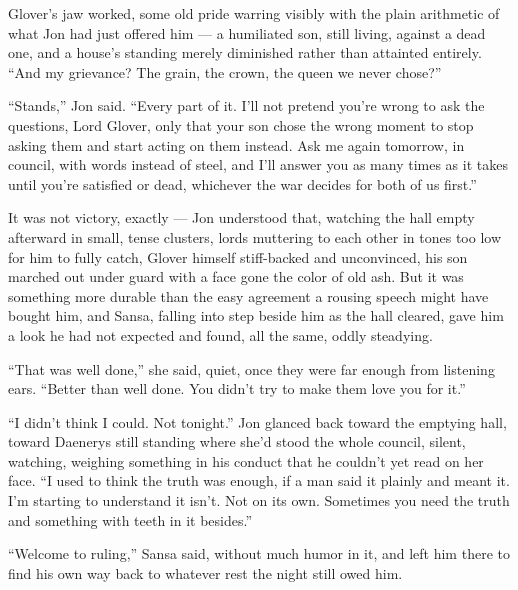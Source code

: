Glover’s jaw worked, some old pride warring visibly with the plain arithmetic of what Jon had just offered him — a humiliated son, still living, against a dead one, and a house’s standing merely diminished rather than attainted entirely. “And my grievance? The grain, the crown, the queen we never chose?”

“Stands,” Jon said. “Every part of it. I’ll not pretend you’re wrong to ask the questions, Lord Glover, only that your son chose the wrong moment to stop asking them and start acting on them instead. Ask me again tomorrow, in council, with words instead of steel, and I’ll answer you as many times as it takes until you’re satisfied or dead, whichever the war decides for both of us first.”

It was not victory, exactly — Jon understood that, watching the hall empty afterward in small, tense clusters, lords muttering to each other in tones too low for him to fully catch, Glover himself stiff-backed and unconvinced, his son marched out under guard with a face gone the color of old ash. But it was something more durable than the easy agreement a rousing speech might have bought him, and Sansa, falling into step beside him as the hall cleared, gave him a look he had not expected and found, all the same, oddly steadying.

“That was well done,” she said, quiet, once they were far enough from listening ears. “Better than well done. You didn’t try to make them love you for it.”

“I didn’t think I could. Not tonight.” Jon glanced back toward the emptying hall, toward Daenerys still standing where she’d stood the whole council, silent, watching, weighing something in his conduct that he couldn’t yet read on her face. “I used to think the truth was enough, if a man said it plainly and meant it. I’m starting to understand it isn’t. Not on its own. Sometimes you need the truth and something with teeth in it besides.”

“Welcome to ruling,” Sansa said, without much humor in it, and left him there to find his own way back to whatever rest the night still owed him.